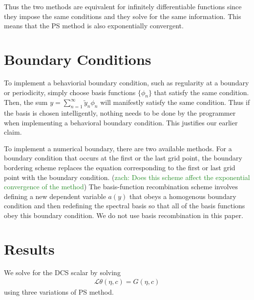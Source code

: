 \documentclass[aps,prd,amsmath,showpacs,amssymb,superscriptaddress,nofootinbib,longbibliography,eqsecnum,preprintnumbers]{revtex4-1}
\newcommand{\zach}[1]{\textcolor{ForestGreen}{#1}}
\begin{document}
Thus the two methods are equivalent for infinitely differentiable functions since they impose the same conditions and they solve for the same information. This means that the PS method is also exponentially convergent.

\section{Boundary Conditions}

To implement a behaviorial boundary condition, such as regularity at a boundary or periodicity, simply choose basis functions $\{\phi_n\}$ that satisfy the same condition. 
Then, 
the sum $y=\sum_{n=1}^\infty \tilde y_n \phi_n$ will manifestly satisfy the same condition. Thus if the basis is chosen intelligently, nothing needs to be done by the programmer when implementing a behavioral boundary condition. This justifies our earlier claim.

To implement a numerical boundary, there are two available methods. For a boundary condition that occurs at the first or the last grid point, the boundary bordering scheme replaces the equation corresponding to the first or last grid point with the boundary condition. (\zach{zach: Does this scheme affect the exponential convergence of the method}) The basis-function recombination scheme involves defining a new dependent variable $a(y)$ that obeys a homogenous boundary condition and then redefining the spectral basis so that all of the basis functions obey this boundary condition. We do not use basis recombination in this paper.



\section{Results}
We solve for the DCS scalar by solving
\begin{align}
\mathcal{L}\theta(\eta,c) =G(\eta, c)
\end{align}
using three variations of PS method.
\end{document}
